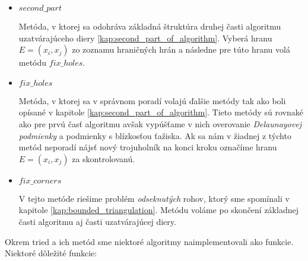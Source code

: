 \begin{itemize}
{\begin{itemize}
{                Metóda ekvivalentná s krokom číslo $9$ v kapitole \ref{kap:finding_new_vertex},
                pokúšajúca sa vytvoriť trojuholníky so susednými vrcholmi $x_{prev}$ a $x_{next}$.
            }
            \item{
                $second\_part$

                Metóda, v ktorej sa odohráva základná štruktúra druhej časti algoritmu uzatvárajúceho
                diery \ref{kap:second_part_of_algorithm}. Vyberá hranu $E=(x_i, x_j)$ zo zoznamu hraničných 
                hrán a následne pre túto hranu volá metódu $fix\_holes$.
            }
            \item{
                $fix\_holes$

                Metóda, v ktorej sa v správnom poradí volajú ďalšie metódy tak ako boli opísané v 
                kapitole \ref{kap:second_part_of_algorithm}. Tieto metódy sú rovnaké ako pre prvú
                časť algoritmu avšak vypúšťame v nich overovanie \textit{Delaunayovej podmienky} a
                podmienky s blízkosťou ťažiska.
                Ak sa nám v žiadnej z týchto metód neporadí nájsť nový trojuholník na konci kroku 
                označíme hranu $E = (x_i, x_j)$ za skontrolovanú.
            }
            \item{
                $fix\_corners$

                V tejto metóde riešime problém \textit{odseknutých} rohov, ktorý sme spomínali v
                kapitole \ref{kap:bounded_triangulation}.
                Metódu voláme po skončení základnej časti algoritmu aj časti uzatvárajúcej diery.
            }
        \end{itemize}
        }

\end{itemize}
Okrem tried a ich metód sme niektoré algoritmy naimplementovali ako funkcie. 
        Niektoré dôležité funkcie:
